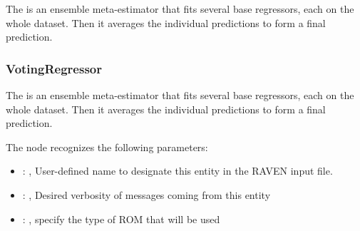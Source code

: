  The  is an ensemble meta-estimator that fits several base
 regressors, each on the whole dataset. Then it averages the individual predictions to form
 a final prediction.

\subsubsection{VotingRegressor}
  The  is an ensemble meta-estimator that fits several base
  regressors, each on the whole dataset. Then it averages the individual predictions to form
  a final prediction.

  The  node recognizes the following parameters:
    \begin{itemize}
      \item {}: , 
        User-defined name to designate this entity in the RAVEN input file.
      \item {}: , 
        Desired verbosity of messages coming from this entity
      \item {}: , 
        specify the type of ROM that will be used
  \end{itemize}


